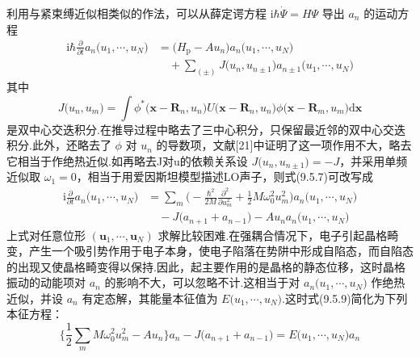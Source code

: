 利用与紧束缚近似相类似的作法，可以从薛定谔方程 $\mathrm{i}\hbar\dot{\varPsi}=H\varPsi$ 导出 $a_{n}$ 的运动方程
\begin{equation}
\begin{aligned}
  \mathrm{i}\hbar\frac{\partial}{\partial t}
  a_{n}\bigl(u_{1},\cdots,u_{N}\bigr)
  &=\bigl(H_{\mathrm p}-Au_{n}\bigr)
  a_{n}\bigl(u_{1},\cdots,u_{N}\bigr)\\
  &\quad+\sum_{(\pm)}J\bigl(u_{n},u_{n\pm1}\bigr)
  a_{n\pm1}\bigl(u_{1},\cdots,u_{N}\bigr)
\end{aligned}
\end{equation}
其中
\begin{equation}
  J\bigl(u_{n},u_{m}\bigr)=\int\phi^{*}
  \bigl(\boldsymbol{x}-\boldsymbol{R}_{n},u_{n}\bigr)
  U\bigl(\boldsymbol{x}-\boldsymbol{R}_{n},u_{n}\bigr)
  \phi\bigl(\boldsymbol{x}-\boldsymbol{R}_{m},u_{m}\bigr)
  \mathrm{d}\boldsymbol{x}
\end{equation}
是双中心交迭积分.在推导过程中略去了三中心积分，只保留最近邻的双中心交迭积分.此外，还略去了 $\phi$ 对 $u_{n}$ 的导数项，文献[21]中证明了这一项作用不大，略去它相当于作绝热近似.如再略去J对u的依赖关系设 $J\bigl(u_{n},u_{n\pm1}\bigr)=-J$，并采用单频近似取 $\omega_{1}=0$，相当于用爱因斯坦模型描述LO声子，则式(9.5.7)可改写成
\begin{equation}
\begin{aligned}
  \mathrm{i}\frac{\partial}{\partial t}
  a_{n}\bigl(u_{1},\cdots,u_{N}\bigr)
  &=\sum_{m}\biggl(-\frac{\hbar^{2}}{2M}
  \frac{\partial^{2}}{\partial u_{m}^{2}}
  +\frac{1}{2}M\omega_{0}^{2}u_{m}^{2}\biggr)
  a_{n}\bigl(u_{1},\cdots,u_{N}\bigr)\\
  &\quad-J\bigl(a_{n+1}+a_{n-1}\bigr)
  -Au_{n}a_{n}\bigl(u_{1},\cdots,u_{N}\bigr)
\end{aligned}
\end{equation}
上式对任意位形 $\left(\boldsymbol{u}_{1},\cdots,\boldsymbol{u}_{N}\right)$ 求解比较困难.在强耦合情况下，电子引起晶格畸变，产生一个吸引势作用于电子本身，使电子陷落在势阱中形成自陷态，而自陷态的出现又使晶格畸变得以保持.因此，起主要作用的是晶格的静态位移，这时晶格振动的动能项对 $a_{n}$ 的影响不大，可以忽略不计.这相当于对 $a_{n}\bigl(u_{1},\cdots,u_{N}\bigr)$ 作绝热近似，并设 $a_{n}$ 有定态解，其能量本征值为 $E\bigl(u_{1},\cdots,u_{N}\bigr)$.这时式(9.5.9)简化为下列本征方程：
\begin{equation}
  \biggl\{\frac{1}{2}\sum_{m}M\omega_{0}^{2}u_{m}^{2}-Au_{n}\biggr\}a_{n}
  -J\bigl(a_{n+1}+a_{n-1}\bigr)
  =E\bigl(u_{1},\cdots,u_{N}\bigr)a_{n}
\end{equation}
